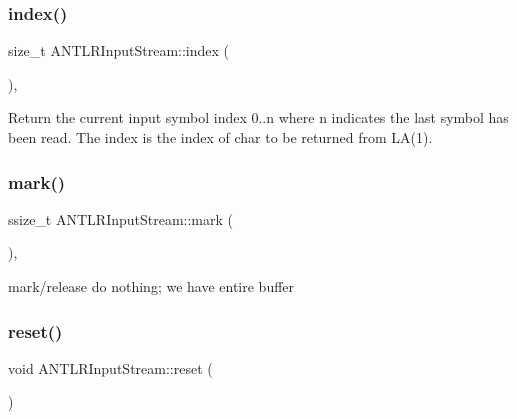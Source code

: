 \subsubsection{\texorpdfstring{index()}{index()}}
{\footnotesize\ttfamily size\+\_\+t A\+N\+T\+L\+R\+Input\+Stream\+::index (\begin{DoxyParamCaption}{ }\end{DoxyParamCaption})\hspace{0.3cm}{\ttfamily [override]}, {\ttfamily [virtual]}}



Return the current input symbol index 0..n where n indicates the last symbol has been read. The index is the index of char to be returned from L\+A(1). 

\mbox{\label{classantlr4_1_1ANTLRInputStream_a5a1520d6417bef7e06cb8d524ec6f76c}} 
\subsubsection{\texorpdfstring{mark()}{mark()}}
{\footnotesize\ttfamily ssize\+\_\+t A\+N\+T\+L\+R\+Input\+Stream\+::mark (\begin{DoxyParamCaption}{ }\end{DoxyParamCaption})\hspace{0.3cm}{\ttfamily [override]}, {\ttfamily [virtual]}}



mark/release do nothing; we have entire buffer 

\mbox{\label{classantlr4_1_1ANTLRInputStream_a3bb10995cd48f3fe06f6399a43d4bbb9}} 
\subsubsection{\texorpdfstring{reset()}{reset()}}
{\footnotesize\ttfamily void A\+N\+T\+L\+R\+Input\+Stream\+::reset (\begin{DoxyParamCaption}{ }\end{DoxyParamCaption})\hspace{0.3cm}{\ttfamily [virtual]}}


